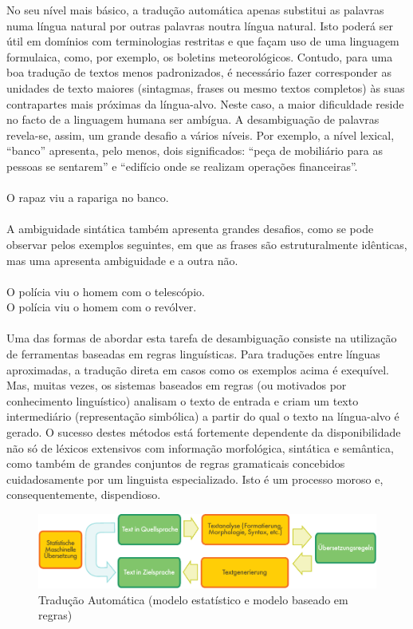 \begin{multicols}{2}
No seu nível mais básico, a tradução automática apenas substitui as palavras numa língua natural por outras palavras noutra língua natural. Isto poderá ser útil em domínios com terminologias restritas e que façam uso de uma linguagem formulaica, como, por exemplo, os boletins meteorológicos. Contudo, para uma boa tradução de textos menos padronizados, é necessário fazer corresponder as unidades de texto maiores (sintagmas, frases ou mesmo textos completos) às suas contrapartes mais próximas da língua-alvo. Neste caso, a maior dificuldade reside no facto de a linguagem humana ser ambígua. A desambiguação de palavras revela-se, assim, um grande desafio a vários níveis. Por exemplo, a nível lexical, “banco” apresenta, pelo menos, dois significados: “peça de mobiliário para as pessoas se sentarem” e “edifício onde se realizam operações financeiras”.\\
\\
O rapaz viu a rapariga no banco. \\
\\
A ambiguidade sintática também apresenta grandes desafios, como se pode observar pelos exemplos seguintes, em que as frases são estruturalmente idênticas, mas uma apresenta ambiguidade e a outra não.\\
\\
O polícia viu o homem com o telescópio.\\
O polícia viu o homem com o revólver.\\
\\
Uma das formas de abordar esta tarefa de desambiguação consiste na utilização de ferramentas baseadas em regras linguísticas. Para traduções entre línguas aproximadas, a tradução direta em casos como os exemplos acima é exequível. Mas, muitas vezes, os sistemas baseados em regras (ou motivados por conhecimento linguístico) analisam o texto de entrada e criam um texto intermediário (representação simbólica) a partir do qual o texto na língua-alvo é gerado. O sucesso destes métodos está fortemente dependente da disponibilidade não só de lé\-xi\-cos extensivos com informação morfológica, sintática e semântica, como também de grandes conjuntos de regras gramaticais concebidos cuidadosamente por um linguista especializado. Isto é um processo moroso e, consequentemente, dispendioso.

\begin{figure}[htb]
  \center
  \includegraphics[width=\textwidth]{../_media/german/machine_translation}
  \caption{Tradução Automática (modelo estatístico e modelo baseado em regras)}
  \label{fig:mtarch_de}
\end{figure}


\end{multicols}

